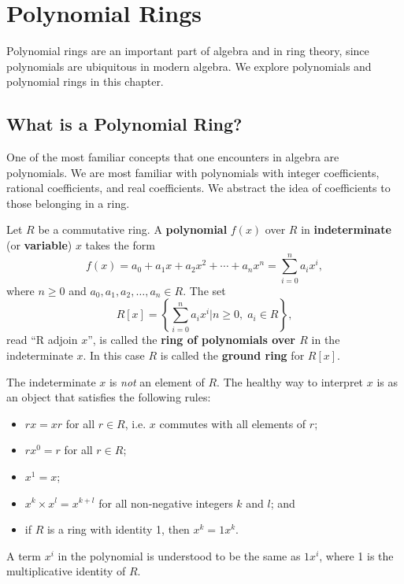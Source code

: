 \chapter{Polynomial Rings}
Polynomial rings are an important part of algebra and in ring theory, since polynomials are ubiquitous in modern algebra. We explore polynomials and polynomial rings in this chapter.

\section{What is a Polynomial Ring?}
One of the most familiar concepts that one encounters in algebra are polynomials. We are most familiar with polynomials with integer coefficients, rational coefficients, and real coefficients. We abstract the idea of coefficients to those belonging in a ring.

\begin{definition}
    Let $R$ be a commutative ring. A \textbf{polynomial} $f(x)$ over $R$ in \textbf{indeterminate} (or \textbf{variable}) $x$ takes the form
    \[
        f(x) = a_0+a_1x+a_2x^2+\cdots+a_nx^n = \sum_{i=0}^n a_ix^i,
    \]
    where $n \geq 0$ and $a_0, a_1, a_2, \dots, a_n \in R$. The set
    \[
        R[x] = \left\{\sum_{i=0}^n a_ix^i \vert n \geq 0, \; a_i \in R\right\},
    \]
    read ``R adjoin $x$'', is called the \textbf{ring of polynomials over $R$} in the indeterminate $x$. In this case $R$ is called the \textbf{ground ring} for $R[x]$.
\end{definition}
\begin{remark}
    The indeterminate $x$ is \textit{not} an element of $R$. The healthy way to interpret $x$ is as an object that satisfies the following rules:
    \begin{itemize}
        \item $rx = xr$ for all $r \in R$, i.e. $x$ commutes with all elements of $r$;
        \item $rx^0 = r$ for all $r \in R$;
        \item $x^1 = x$;
        \item $x^k \times x^l = x^{k+l}$ for all non-negative integers $k$ and $l$; and
        \item if $R$ is a ring with identity 1, then $x^k = 1x^k$.
    \end{itemize}
\end{remark}
\begin{remark}
    A term $x^i$ in the polynomial is understood to be the same as $1x^i$, where 1 is the multiplicative identity of $R$.
\end{remark}

